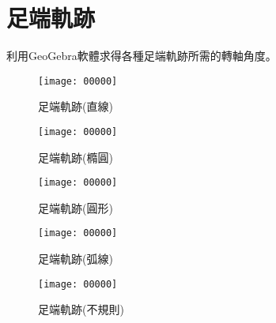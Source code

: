 \section*{足端軌跡}
利用GeoGebra軟體求得各種足端軌跡所需的轉軸角度。\

\begin{figure}[htbp]
  \centering
  \begin{minipage}{0.45\linewidth}
    \centering
    \texttt{[image: 00000]}
    \caption{足端軌跡(直線)}
    \label{足端軌跡(直線)}
  \end{minipage}
  \hfill
  \begin{minipage}{0.45\linewidth}
    \centering
    \texttt{[image: 00000]}
    \caption{足端軌跡(橢圓)}
    \label{足端軌跡(橢圓)}
  \end{minipage}
  
  \vspace{0.2cm} %
  
  \begin{minipage}{0.45\linewidth}
    \centering
    \texttt{[image: 00000]}
    \caption{足端軌跡(圓形)}
    \label{足端軌跡(圓形)}
  \end{minipage}
  \hfill
  \begin{minipage}{0.45\textwidth}
    \centering
    \texttt{[image: 00000]}
    \caption{足端軌跡(弧線)}
    \label{足端軌跡(弧線)}
  \end{minipage}
  
  \vspace{0.2cm} %
  
  \begin{minipage}{0.45\linewidth}
    \centering
    \texttt{[image: 00000]}
    \caption{足端軌跡(不規則)}
    \label{足端軌跡(不規則)}
  \end{minipage}
\end{figure}
  
\newpage
